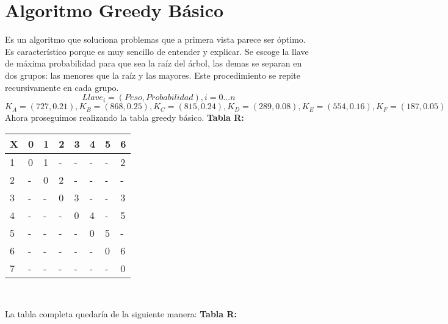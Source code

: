 \documentclass[10pt,letterpaper]{article}
\begin{document}
\section{Algoritmo Greedy Básico} 
        Es un algoritmo que soluciona problemas que a primera vista parece ser 
        óptimo. Es característico porque es muy sencillo de entender y explicar. 
        Se escoge la llave de máxima probabilidad para que sea la raíz del árbol, las 
        demas se separan en dos grupos: las menores que la raíz y las mayores. Este 
        procedimiento se repite recursivamente en cada grupo. 
        \[ Llave_{i} = (Peso, Probabilidad), i = 0...n \]
\[ K_{A} = (727, 0.21), K_{B} = (868, 0.25), K_{C} = (815, 0.24), K_{D} = (289, 0.08), K_{E} = (554, 0.16), K_{F} = (187, 0.05) \]
\newline Ahora proseguimos realizando la tabla greedy básico.
\textbf{Tabla R: }
\begin{center}
\begin{tabu} to 1.0\textwidth { | l | l | l | l | l | l | l | l | }
\hline
{}\color{black}\textbf{X} & \color{black}\textbf{0} & \color{black}\textbf{1} & \color{black}\textbf{2} & \color{black}\textbf{3} & \color{black}\textbf{4} & \color{black}\textbf{5} & \color{black}\textbf{6} \\ 
\hline
{}\color{black}1 &  0  &  1  &  -  &  -  &  -  &  -  &  2  \\ 
\hline
{}\color{black}2 &  -  &  0  &  2  &  -  &  -  &  -  &  -  \\ 
\hline
{}\color{black}3 &  -  &  -  &  0  &  3  &  -  &  -  &  3  \\ 
\hline
{}\color{black}4 &  -  &  -  &  -  &  0  &  4  &  -  &  5  \\ 
\hline
{}\color{black}5 &  -  &  -  &  -  &  -  &  0  &  5  &  -  \\ 
\hline
{}\color{black}6 &  -  &  -  &  -  &  -  &  -  &  0  &  6  \\ 
\hline
{}\color{black}7 &  -  &  -  &  -  &  -  &  -  &  -  &  0  \\ 
\hline
\end{tabu} \\
\end{center}
La tabla completa quedaría de la siguiente manera: 
\textbf{Tabla R: }
\end{document}
